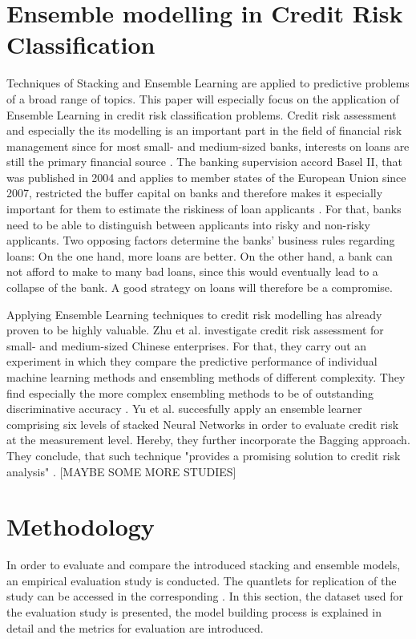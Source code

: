 \documentclass[12pt]{article}
\begin{document}
\section{Ensemble modelling in Credit Risk Classification}
Techniques of Stacking and Ensemble Learning are applied to predictive problems of a broad range of topics. This paper will especially focus on the application of Ensemble Learning in credit risk classification problems. Credit risk assessment and especially the its modelling is an important part in the field of financial risk management since for most small- and medium-sized banks, interests on loans are still the primary financial source \citep[p.2]{jacobson2006internal}. The banking supervision accord Basel II, that was published in 2004 and applies to member states of the European Union since 2007, restricted the buffer capital on banks and therefore makes it especially important for them to estimate the riskiness of loan applicants \citep{basel2}. For that, banks need to be able to distinguish between applicants into risky and non-risky applicants. Two opposing factors determine the banks' business rules regarding loans: On the one hand, more loans are better. On the other hand, a bank can not afford to make to many bad loans, since this would eventually lead to a collapse of the bank. A good strategy on loans will therefore be a compromise. 

Applying Ensemble Learning techniques to credit risk modelling has already proven to be highly valuable. Zhu et al. \citeyear{zhu2017comparison} investigate credit risk assessment for small- and medium-sized Chinese enterprises. For that, they carry out an experiment in which they compare the predictive performance of individual machine learning methods and ensembling methods of different complexity. They find especially the more complex ensembling methods to be of outstanding discriminative accuracy \citep[p.46f.]{zhu2017comparison}. Yu et al. \citeyear{yu2008credit} succesfully apply an ensemble learner comprising six levels of stacked Neural Networks in order to evaluate credit risk at the measurement level. Hereby, they further incorporate the Bagging approach. They conclude, that such technique "provides a promising solution to credit risk analysis" \citep[p.1443]{yu2008credit}. [MAYBE SOME MORE STUDIES]




\section{Methodology}
In order to evaluate and compare the introduced stacking and ensemble models, an empirical evaluation study is conducted. The quantlets for replication of the study can be accessed in the corresponding \href{https://github.com/schreckf/NIC_Schreck}{\color{DarkBlue}{github repository}}. In this section, the dataset used for the evaluation study is presented, the model building process is explained in detail and the metrics for evaluation are introduced.
\end{document}
